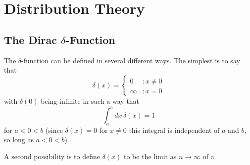 
\chapter{Distribution Theory}
\label{ch:distribution-theory}

\section{The Dirac $\delta$-Function}

The $\delta$-function can be defined in several different ways.  The
simplest is to say that
%
\begin{equation*}
  \delta(x) = \left\{
    \begin{array}{lr}
      0 & : x \neq 0\\
      \infty & : x = 0
    \end{array}
  \right.
\end{equation*}
%
with $\delta(0)$ being infinite in such a way that
%
\begin{equation*}
  \int_a^b dx\,\delta(x) = 1
\end{equation*}
for $a < 0 < b$ (since $\delta(x) = 0$ for $x \neq 0$ this integral is
independent of $a$ and $b$, so long as $a < 0 < b$).

A second possibility is to define $\delta(x)$ to be the limit as $n
\rightarrow \infty$ of a 